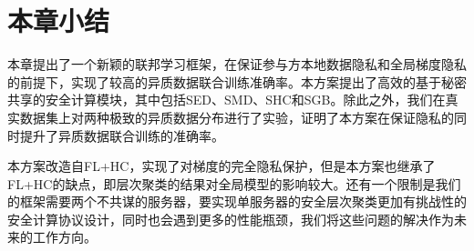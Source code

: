 \section{本章小结}\label{4-conclusion}
本章提出了一个新颖的联邦学习框架，在保证参与方本地数据隐私和全局梯度隐私的前提下，实现了较高的异质数据联合训练准确率。本方案提出了高效的基于秘密共享的安全计算模块，其中包括SED、SMD、SHC和SGB。除此之外，我们在真实数据集上对两种极致的异质数据分布进行了实验，证明了本方案在保证隐私的同时提升了异质数据联合训练的准确率。

本方案改造自FL+HC\cite{briggs2020federated}，实现了对梯度的完全隐私保护，但是本方案也继承了FL+HC的缺点，即层次聚类的结果对全局模型的影响较大。还有一个限制是我们的框架需要两个不共谋的服务器，要实现单服务器的安全层次聚类更加有挑战性的安全计算协议设计，同时也会遇到更多的性能瓶颈，我们将这些问题的解决作为未来的工作方向。